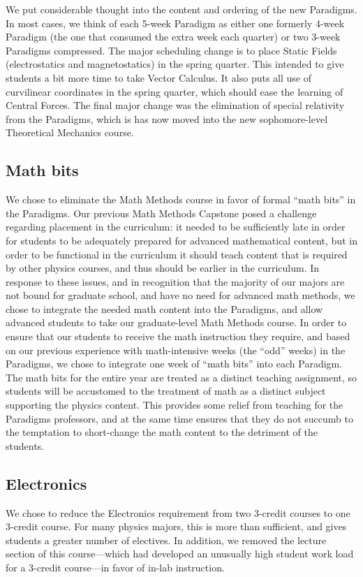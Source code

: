 \documentclass[english,aps,pra,reprint,noshowpacs,superscriptaddress]{revtex4-1}
\begin{document}
We put considerable thought into the content and ordering of the new
Paradigms.  In most cases, we think of each 5-week Paradigm as either
one formerly 4-week Paradigm (the one that consumed the extra week
each quarter) or two 3-week Paradigms compressed.  The major
scheduling change is to place Static Fields (electrostatics and
magnetostatics) in the spring quarter.  This intended to give students
a bit more time to take Vector Calculus.  It also puts all use of
curvilinear coordinates in the spring quarter, which should ease the
learning of Central Forces.  The final major change was the
elimination of special relativity from the Paradigms, which is has now
moved into the new sophomore-level Theoretical Mechanics course.

\subsection{Math bits}
We chose to eliminate the Math Methods course in favor of formal
``math bits'' in the Paradigms.  Our previous Math Methods Capstone
posed a challenge regarding placement in the curriculum: it needed to
be sufficiently late in order for students to be adequately prepared
for advanced mathematical content, but in order to be functional in
the curriculum it should teach content that is required by other
physics courses, and thus should be earlier in the curriculum.  In
response to these issues, and in recognition that the majority of our
majors are not bound for graduate school, and have no need for
advanced math methods, we chose to integrate the needed math content
into the Paradigms, and allow advanced students to take our
graduate-level Math Methods course.  In order to ensure that our
students to receive the math instruction they require, and based on
our previous experience with math-intensive weeks (the ``odd'' weeks)
in the Paradigms, we chose to integrate one week of ``math bits'' into
each Paradigm.  The math bits for the entire year are treated as a
distinct teaching assignment, so students will be accustomed to the
treatment of math as a distinct subject supporting the physics
content.  This provides some relief from teaching for the Paradigms
professors, and at the same time ensures that they do not succumb to
the temptation to short-change the math content to the detriment of
the students.

\subsection{Electronics}
We chose to reduce the Electronics requirement from two 3-credit
courses to one 3-credit course.  For many physics majors, this is more
than sufficient, and gives students a greater number of electives.  In
addition, we removed the lecture section of this course---which had
developed an unusually high student work load for a 3-credit
course---in favor of in-lab instruction.
\end{document}
